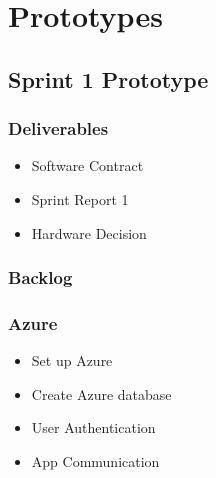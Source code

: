 

\chapter{Prototypes}

\section{Sprint 1 Prototype}
\subsection{Deliverables}
\begin{itemize}
\item Software Contract
\item Sprint Report 1
\item Hardware Decision
\end{itemize}

\subsection{Backlog}
\subsection*{Azure}
\begin{itemize}
\item Set up Azure
\item Create Azure database
\item User Authentication
\item App Communication
\end{itemize}

